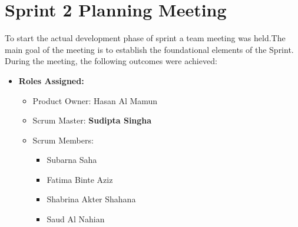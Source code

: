 \documentclass[a4paper,12pt]{article}
\begin{document}
\section{Sprint 2 Planning Meeting}
To start the actual development phase of sprint
a team meeting was held.The main goal of the meeting is to establish the foundational elements of the Sprint. During the meeting, the following outcomes were achieved:
\begin{itemize}
    \item \textbf{Roles Assigned:}
        \begin{itemize}
            \item Product Owner: Hasan Al Mamun
            \item Scrum Master: \textbf{Sudipta Singha}
            \item Scrum Members:
                \begin{itemize}
                    \item Subarna Saha
                    \item Fatima Binte Aziz
                    \item Shabrina Akter Shahana
                    \item Saud Al Nahian

                \end{itemize}
        \end{itemize}


\end{itemize}
\end{document}
